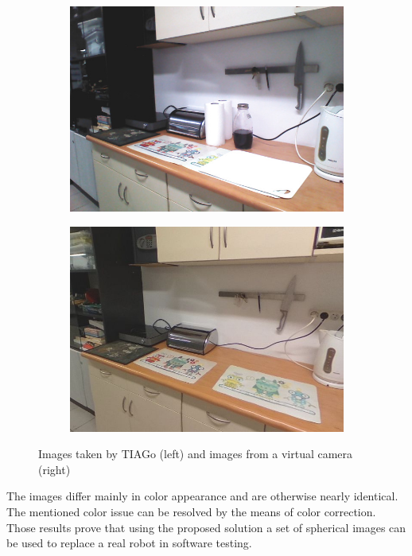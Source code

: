 \documentclass{svproc}
\begin{document}
\begin{figure}[!ht]
    \begin{subfigure}{0.46\textwidth}
        \centering
        \includegraphics[width=\linewidth]{img/sim_vs_tiago/tia_kuchnia_blat.jpg}
        \caption{}
        \vspace*{1em}
    \end{subfigure}\hfill%
    \begin{subfigure}{0.46\textwidth}
        \centering
        \includegraphics[width=\linewidth]{img/sim_vs_tiago/sim_kuchnia_blat.jpg}
        \caption{}
        \vspace*{1em}
    \end{subfigure}
    \caption{Images taken by TIAGo (left) and images from a virtual camera (right)}
    \label{fig:sim_vs_tiago}
\end{figure}

The images differ mainly in color appearance and are otherwise nearly identical.
The mentioned color issue can be resolved by the means of color correction.
Those results prove that using the proposed solution a set of spherical images can be used to replace a real robot in software testing.

\clearpage

\nocite{*}


\end{document}
